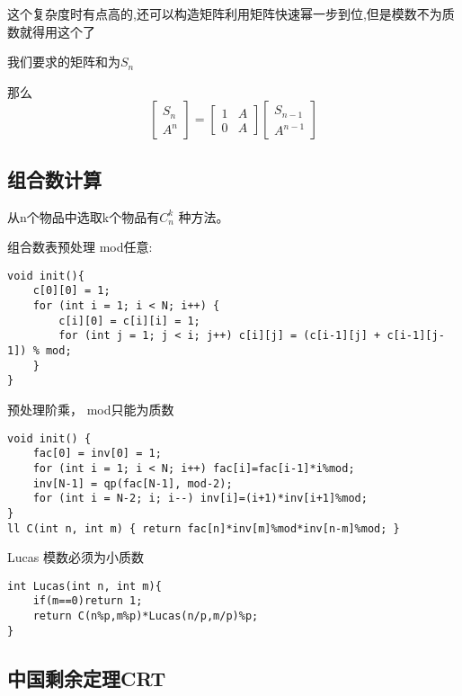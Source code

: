 这个复杂度时有点高的,还可以构造矩阵利用矩阵快速幂一步到位,但是模数不为质数就得用这个了

我们要求的矩阵和为$S_n$

那么 $$ \begin{bmatrix} S_n \\ A^n  \end{bmatrix}  =  \begin{bmatrix}1 & A \\ 0  & A  \end{bmatrix} \begin{bmatrix} S_{n-1} \\ A^{n-1}  \end{bmatrix} $$ 

\subsection{组合数计算}

从n个物品中选取k个物品有$C_n^{k}$ 种方法。

组合数表预处理 mod任意:

\begin{lstlisting}
void init(){
    c[0][0] = 1;
    for (int i = 1; i < N; i++) {
        c[i][0] = c[i][i] = 1;
        for (int j = 1; j < i; j++) c[i][j] = (c[i-1][j] + c[i-1][j-1]) % mod;
    }
}
\end{lstlisting}

预处理阶乘， mod只能为质数

\begin{lstlisting}
void init() {
    fac[0] = inv[0] = 1;
    for (int i = 1; i < N; i++) fac[i]=fac[i-1]*i%mod;
    inv[N-1] = qp(fac[N-1], mod-2);
    for (int i = N-2; i; i--) inv[i]=(i+1)*inv[i+1]%mod;
}
ll C(int n, int m) { return fac[n]*inv[m]%mod*inv[n-m]%mod; }
\end{lstlisting}

Lucas 模数必须为小质数

\begin{lstlisting}
int Lucas(int n, int m){
    if(m==0)return 1;
    return C(n%p,m%p)*Lucas(n/p,m/p)%p;
}
\end{lstlisting}


\subsection{中国剩余定理CRT}


